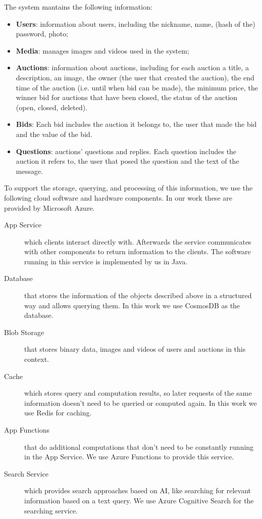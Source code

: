 \documentclass[runningheads]{llncs}
\begin{document}
The system mantains the following information:
\begin{itemize}
    \item \textbf{Users}: information about users, including the nickname, name, (hash of the) password, photo;
    \item \textbf{Media}: manages images and videos used in the system;
    \item \textbf{Auctions}: information about auctions, including for each auction a title, a description, an image, the owner (the user that created the auction), the end time of the auction (i.e. until when bid can be made), the minimum price, the winner bid for auctions that have been closed, the status of the auction (open, closed, deleted).
    \item \textbf{Bids}: Each bid includes the auction it belongs to, the user that made the bid and the value of the bid.
    \item \textbf{Questions}: auctions' questions and replies. Each question includes the auction it refers to, the user that posed the question and the text of the message. 
\end{itemize}

To support the storage, querying, and processing of this information, we use the following cloud software and hardware components. In our work these are provided by Microsoft Azure.

\begin{description}
    \item[App Service] which clients interact directly with. Afterwards the service communicates with other components to return information to the clients. The software running in this service is implemented by us in Java.
    \item[Database] that stores the information of the objects described above in a structured way and allows querying them. In this work we use CosmosDB as the database.
    \item[Blob Storage] that stores binary data, images and videos of users and auctions in this context.
    \item[Cache] which stores query and computation results, so later requests of the same information doesn't need to be queried or computed again. In this work we use Redis for caching.
    \item[App Functions] that do additional computations that don't need to be constantly running in the App Service. We use Azure Functions to provide this service.
    \item[Search Service] which provides search approaches based on AI, like searching for relevant information based on a text query. We use Azure Cognitive Search for the searching service.
\end{description}
\end{document}

